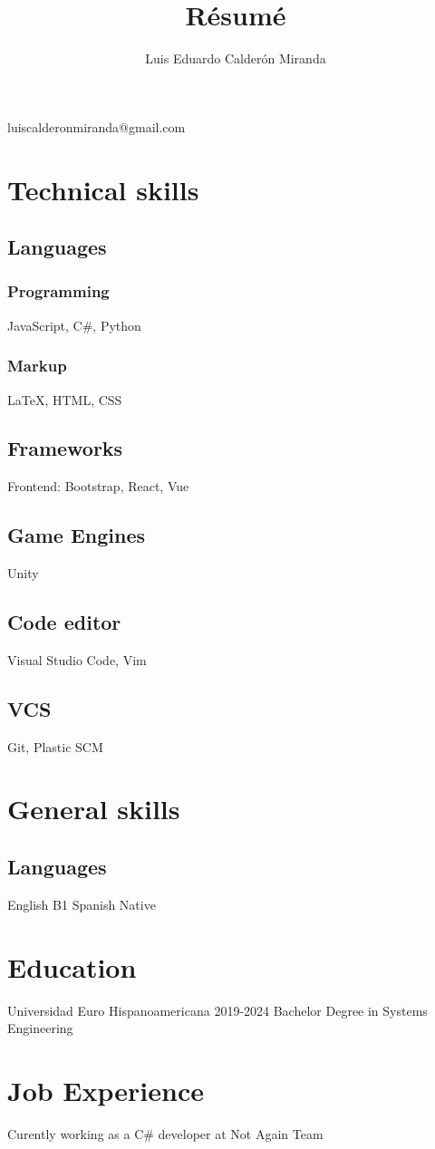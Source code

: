 \documentclass{article}
\makeatletter
\renewcommand{\maketitle}{
\begin{center}
{\huge\bfseries}
\theauthor

\vspace{.25em}
luiscalderonmiranda@gmail.com

\end{center}
}
\makeatother
\begin{document}
\title{R\'esum\'e}
\author{Luis Eduardo Calder\'on Miranda}

\maketitle

\section{Technical skills}

\subsection{Languages}

\subsubsection{Programming}

JavaScript, C\#, Python

\subsubsection{Markup}

{\LaTeX}, HTML, CSS

\subsection{Frameworks}

Frontend: Bootstrap, React, Vue

\subsection{Game Engines}

Unity

\subsection{Code editor}

Visual Studio Code, Vim

\subsection{VCS}

Git, Plastic SCM

\section{General skills}

\subsection{Languages}

English B1 
\newline
Spanish Native

\section{Education}

Universidad Euro Hispanoamericana 2019-2024
Bachelor Degree in Systems Engineering

\section{Job Experience}

Curently working as a C\# developer at Not Again Team 
\end{document}

